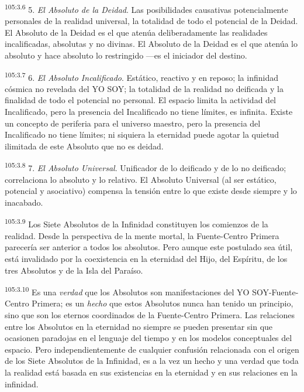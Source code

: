 \documentclass[twoside, 11pt]{book}
\begin{document}
\par
\textsuperscript{105:3.6} 5. \textit{El Absoluto de la Deidad}. Las posibilidades causativas potencialmente personales de la realidad universal, la totalidad de todo el potencial de la Deidad. El Absoluto de la Deidad es el que atenúa deliberadamente las realidades incalificadas, absolutas y no divinas. El Absoluto de la Deidad es el que atenúa lo absoluto y hace absoluto lo restringido ---es el iniciador del destino.

\par
\textsuperscript{105:3.7} 6. \textit{El Absoluto Incalificado}. Estático, reactivo y en reposo; la infinidad cósmica no revelada del YO SOY; la totalidad de la realidad no deificada y la finalidad de todo el potencial no personal. El espacio limita la actividad del Incalificado, pero la presencia del Incalificado no tiene límites, es infinita. Existe un concepto de periferia para el universo maestro, pero la presencia del Incalificado no tiene límites; ni siquiera la eternidad puede agotar la quietud ilimitada de este Absoluto que no es deidad.

\par
\textsuperscript{105:3.8} 7. \textit{El Absoluto Universal}. Unificador de lo deificado y de lo no deificado; correlaciona lo absoluto y lo relativo. El Absoluto Universal (al ser estático, potencial y asociativo) compensa la tensión entre lo que existe desde siempre y lo inacabado.

\par
\textsuperscript{105:3.9} Los Siete Absolutos de la Infinidad constituyen los comienzos de la realidad. Desde la perspectiva de la mente mortal, la Fuente-Centro Primera parecería ser anterior a todos los absolutos. Pero aunque este postulado sea útil, está invalidado por la coexistencia en la eternidad del Hijo, del Espíritu, de los tres Absolutos y de la Isla del Paraíso.

\par
\textsuperscript{105:3.10} Es una \textit{verdad} que los Absolutos son manifestaciones del YO SOY-Fuente-Centro Primera; es un \textit{hecho} que estos Absolutos nunca han tenido un principio, sino que son los eternos coordinados de la Fuente-Centro Primera. Las relaciones entre los Absolutos en la eternidad no siempre se pueden presentar sin que ocasionen paradojas en el lenguaje del tiempo y en los modelos conceptuales del espacio. Pero independientemente de cualquier confusión relacionada con el origen de los Siete Absolutos de la Infinidad, es a la vez un hecho y una verdad que toda la realidad está basada en sus existencias en la eternidad y en sus relaciones en la infinidad.
\end{document}
